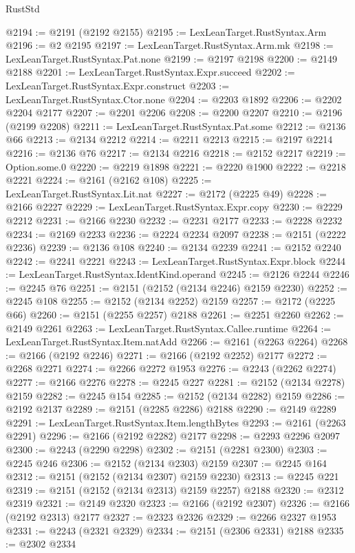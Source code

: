 \begin{lexlean}{RustStd}
\begin{coremodule}
@2194 := @2191 (@2192 @2155)
@2195 := LexLeanTarget.RustSyntax.Arm
@2196 := @2 @2195
@2197 := LexLeanTarget.RustSyntax.Arm.mk
@2198 := LexLeanTarget.RustSyntax.Pat.none
@2199 := @2197 @2198
@2200 := @2149 @2188
@2201 := LexLeanTarget.RustSyntax.Expr.succeed
@2202 := LexLeanTarget.RustSyntax.Expr.construct
@2203 := LexLeanTarget.RustSyntax.Ctor.none
@2204 := @2203 @1892
@2206 := @2202 @2204 @2177
@2207 := @2201 @2206
@2208 := @2200 @2207
@2210 := @2196 (@2199 @2208)
@2211 := LexLeanTarget.RustSyntax.Pat.some
@2212 := @2136 @66
@2213 := @2134 @2212
@2214 := @2211 @2213
@2215 := @2197 @2214
@2216 := @2136 @76
@2217 := @2134 @2216
@2218 := @2152 @2217
@2219 := Option.some.{0}
@2220 := @2219 @1898
@2221 := @2220 @1900
@2222 := @2218 @2221
@2224 := @2161 (@2162 @108)
@2225 := LexLeanTarget.RustSyntax.Lit.nat
@2227 := @2172 (@2225 @49)
@2228 := @2166 @2227
@2229 := LexLeanTarget.RustSyntax.Expr.copy
@2230 := @2229 @2212
@2231 := @2166 @2230
@2232 := @2231 @2177
@2233 := @2228 @2232
@2234 := @2169 @2233
@2236 := @2224 @2234 @2097
@2238 := @2151 (@2222 @2236)
@2239 := @2136 @108
@2240 := @2134 @2239
@2241 := @2152 @2240
@2242 := @2241 @2221
@2243 := LexLeanTarget.RustSyntax.Expr.block
@2244 := LexLeanTarget.RustSyntax.IdentKind.operand
@2245 := @2126 @2244
@2246 := @2245 @76
@2251 := @2151 (@2152 (@2134 @2246) @2159 @2230)
@2252 := @2245 @108
@2255 := @2152 (@2134 @2252) @2159
@2257 := @2172 (@2225 @66)
@2260 := @2151 (@2255 @2257) @2188
@2261 := @2251 @2260
@2262 := @2149 @2261
@2263 := LexLeanTarget.RustSyntax.Callee.runtime
@2264 := LexLeanTarget.RustSyntax.Item.natAdd
@2266 := @2161 (@2263 @2264)
@2268 := @2166 (@2192 @2246)
@2271 := @2166 (@2192 @2252) @2177
@2272 := @2268 @2271
@2274 := @2266 @2272 @1953
@2276 := @2243 (@2262 @2274)
@2277 := @2166 @2276
@2278 := @2245 @227
@2281 := @2152 (@2134 @2278) @2159
@2282 := @2245 @154
@2285 := @2152 (@2134 @2282) @2159
@2286 := @2192 @2137
@2289 := @2151 (@2285 @2286) @2188
@2290 := @2149 @2289
@2291 := LexLeanTarget.RustSyntax.Item.lengthBytes
@2293 := @2161 (@2263 @2291)
@2296 := @2166 (@2192 @2282) @2177
@2298 := @2293 @2296 @2097
@2300 := @2243 (@2290 @2298)
@2302 := @2151 (@2281 @2300)
@2303 := @2245 @246
@2306 := @2152 (@2134 @2303) @2159
@2307 := @2245 @164
@2312 := @2151 (@2152 (@2134 @2307) @2159 @2230)
@2313 := @2245 @221
@2319 := @2151 (@2152 (@2134 @2313) @2159 @2257) @2188
@2320 := @2312 @2319
@2321 := @2149 @2320
@2323 := @2166 (@2192 @2307)
@2326 := @2166 (@2192 @2313) @2177
@2327 := @2323 @2326
@2329 := @2266 @2327 @1953
@2331 := @2243 (@2321 @2329)
@2334 := @2151 (@2306 @2331) @2188
@2335 := @2302 @2334

\end{coremodule}
\end{lexlean}
